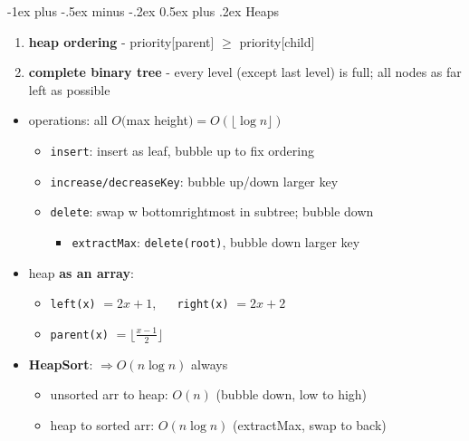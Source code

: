 \documentclass[10pt, landscape]{article}
\makeatletter
\renewcommand{\section}{\@startsection{section}{1}{0mm}%
                                {-1ex plus -.5ex minus -.2ex}%
                                {0.5ex plus .2ex}%
                                {\normalfont\large\bfseries}}
\newcommand{\floor}[1]{\lfloor #1 \rfloor}
\let\then\Rightarrow
\newcommand{\code}[1]{\textcolor{myblue}{\texttt{#1}}}
\makeatother
\begin{document}
\begin{multicols}{4}
\section{Heaps}
\begin{enumerate}
    \item \textbf{heap ordering} - priority[parent] $\geq$ priority[child]
    \item \textbf{complete binary tree} - every level (except last level) is full; all nodes as far left as possible
\end{enumerate}
\begin{itemize}
    \item operations: all $O($max height$) = O(\floor{\log n})$
    \begin{itemize}
        \item \code{insert}: insert as leaf, bubble up to fix ordering
        \item \code{increase/decreaseKey}: bubble up/down larger key
        \item \code{delete}: swap w bottomrightmost in subtree; bubble down
        \begin{itemize}
            \item \code{extractMax}: \code{delete(root)}, bubble down larger key
        \end{itemize} 
    \end{itemize}
    \item heap \textbf{as an array}:
    \begin{itemize}
        \item \code{left(x)} $= 2x + 1$, $\quad$ \code{right(x)} $= 2x + 2$
        \item \code{parent(x)} $= \floor{\frac{x-1}{2}}$
    \end{itemize}
    \item \textbf{HeapSort}: $\then O(n \log n)$ always
    \begin{itemize}
        \item unsorted arr to heap: $O(n)$ (bubble down, low to high)
        \item heap to sorted arr: $O(n \log n)$ (extractMax, swap to back)
    \end{itemize}
\end{itemize}


\end{multicols}
\end{document}
